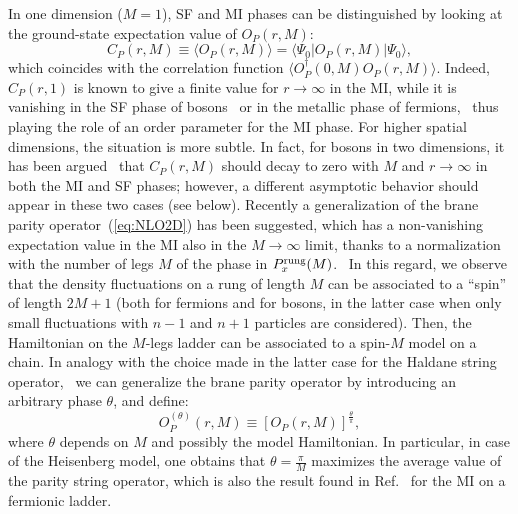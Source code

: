 \documentclass[aps,prb,floatfix,twocolumn,amsmath,amssymb]{revtex4}
\begin{document}
In one dimension ($M=1$), SF and MI phases can be distinguished by looking at the ground-state expectation value of $O_P(r,M)$:
\begin{equation}
C_P(r,M) \equiv \langle O_P(r,M) \rangle = \langle\Psi_0| O_P(r,M) |\Psi_0\rangle,
\end{equation}
which coincides with the correlation function $\langle O_P^\dagger(0,M) O_P(r,M) \rangle$. Indeed, $C_P(r,1)$ is known to give a 
finite value for $r \to \infty$ in the MI, while it is vanishing in the SF phase of bosons~\cite{Berg2008} or in the metallic phase 
of fermions,~\cite{Montorsi2012} thus playing the role of an order parameter for the MI phase. For higher spatial dimensions, the 
situation is more subtle. In fact, for bosons in two dimensions, it has been argued~\cite{Rath2013} that $C_P(r,M)$ should decay to 
zero with $M$ and $r \to \infty$ in both the MI and SF phases; however, a different asymptotic behavior should appear in these two 
cases (see below). Recently a generalization of the brane parity operator~(\ref{eq:NLO2D}) has been suggested, which has a non-vanishing 
expectation value in the MI also in the $M \to \infty$ limit, thanks to a normalization with the number of legs $M$ of the phase 
in $P_x^{\rm rung}(M)$.~\cite{Boschi2016} In this regard, we observe that the density fluctuations on a rung of length $M$ can be 
associated to a ``spin'' of length $2M+1$ (both for fermions and for bosons, in the latter case when only small fluctuations with 
$n-1$ and $n+1$ particles are considered). Then, the Hamiltonian on the $M$-legs ladder can be associated to a spin-$M$ model on 
a chain. In analogy with the choice made in the latter case for the Haldane string operator,~\cite{Oshikawa1992,Qin2003} we can 
generalize the brane parity operator by introducing an arbitrary phase $\theta$, and define:
\begin{equation}\label{eq:OPth}
O_P^{(\theta)}(r,M) \equiv \left [ O_P(r,M) \right ]^\frac{\theta}{\pi},
\end{equation}
where $\theta$ depends on $M$ and possibly the model Hamiltonian. In particular, in case of the Heisenberg model, one obtains that 
$\theta=\frac{\pi}{M}$ maximizes the average value of the parity string operator, which is also the result found in 
Ref.~ for the MI on a fermionic ladder.
\end{document}
